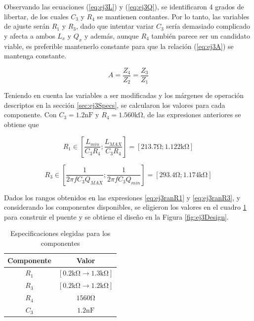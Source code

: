     Observando las ecuaciones (\ref{eq:ej3L}) y (\ref{eq:ej3Q}), se identificaron 4 grados
    de libertar, de los cuales $C_3$ y $R_4$ se mantienen contantes. Por lo tanto, las variables
    de ajuste serán $R_1$ y $R_3$, dado que intentar variar $C_3$ sería demasiado 
    complicado y afecta a ambos $L_x$ y $Q_x$ y además, aunque $R_4$ también parece
    ser un candidato viable, es preferible mantenerlo constante para que la relación
    (\ref{eq:ej3A}) se mantenga constante.
    
    \begin{equation}
        A=\frac{Z_4}{Z_2}=\frac{Z_3}{Z_1}
        \label{eq:ej3A}
    \end{equation}
    
    Teniendo en cuenta las variables a ser modificadas y los márgenes de operación
    descriptos en la sección \ref{sec:ej3Specs}, se calcularon los valores para cada componente.
    Con $C_3=1.2\si{\nano\farad}$ y $R_4=1.560\si{\kilo\ohm}$, de las expresiones anteriores se 
    obtiene que

    \begin{equation}
        R_1 \in \left[\frac{L_{min}}{C_3 R_4};\frac{L_{MAX}}{C_3 R_4}\right] = [213.7\si{\ohm}; 1.122\si{\kilo\ohm}]
        \label{eq:ej3ranR1}
    \end{equation}

    \begin{equation}
        R_3 \in \left[\frac{1}{2 \pi f C_3 Q_{MAX}}; \frac{1}{2 \pi f C_3 Q_{min}}\right] = [293.4\si{\ohm}; 1.174\si{\kilo\ohm}]
        \label{eq:ej3ranR3}
    \end{equation}

    Dados los rangos obtenidos en las expresiones \ref{eq:ej3ranR1} y \ref{eq:ej3ranR3}, y considerando
    los componentes disponibles, se eligieron los valores en el cuadro \ref{tab:ej3Specs} para construir
    el puente y se obtiene el diseño en la Figura \ref{fig:ej3Design}.

    \begin{table}[h]
        \begin{center}
            \begin{tabular}{|c|c|}
                \hline
                Componente & Valor \\
                \hline
                $R_1$ & $[0.2\si{\kilo\ohm} \rightarrow 1.3\si{\kilo\ohm}]$\\
                $R_3$ & $[0.2\si{\kilo\ohm} \rightarrow 1.2\si{\kilo\ohm}]$\\
                $R_4$ & $1560\si{\ohm}$\\
                $C_3$ & $1.2\si{\nano\farad}$\\
                \hline
            \end{tabular}
            \caption{Especificaciones elegidas para los componentes}
            \label{tab:ej3Specs}
        \end{center}
    \end{table}

